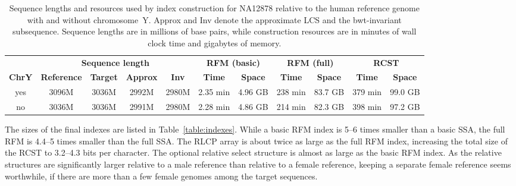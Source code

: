 \documentclass[a4paper,11pt]{llncs}
\newcommand{\RCST}{\textsf{RCST}}
\newcommand{\SSA}{\textsf{SSA}}
\newcommand{\RFM}{\textsf{RFM}}
\newcommand{\RLCP}{\textsf{RLCP}}
\newcommand{\LCS}{\textsf{LCS}}
\begin{document}
\begin{table}
\caption{Sequence lengths and resources used by index construction for NA12878
relative to the human reference genome with and without chromosome~Y. Approx
and Inv denote the approximate \LCS{} and the bwt-invariant subsequence.
Sequence lengths are in millions of base pairs, while construction resources
are in minutes of wall clock time and gigabytes of
memory.}\label{table:construction}
\setlength{\extrarowheight}{2pt}
\setlength{\tabcolsep}{3pt}
\begin{center}
\begin{tabular}{c|cccc|cc|cc|cc}
\hline
 &
\multicolumn{4}{c|}{\textbf{Sequence length}} &
\multicolumn{2}{c|}{\textbf{\RFM{} (basic)}} &
\multicolumn{2}{c|}{\textbf{\RFM{} (full)}} &
\multicolumn{2}{c}{\textbf{\RCST}} \\
\textbf{ChrY} &
\textbf{Reference} & \textbf{Target} & \textbf{Approx} & \textbf{Inv} &
\textbf{Time} & \textbf{Space} &
\textbf{Time} & \textbf{Space} &
\textbf{Time} & \textbf{Space} \\
\hline
yes & 3096M & 3036M & 2992M & 2980M & 2.35 min & 4.96 GB & 238 min & 83.7 GB &
379 min & 99.0 GB \\
no  & 3036M & 3036M & 2991M & 2980M & 2.28 min & 4.86 GB & 214 min & 82.3 GB &
398 min & 97.2 GB \\
\hline
\end{tabular}
\end{center}
\end{table}

The sizes of the final indexes are listed in Table~\ref{table:indexes}. While
a basic \RFM{} index is 5\nobreakdash--6 times smaller than a basic \SSA, the
full \RFM{} is 4.4\nobreakdash--5 times smaller than the full \SSA. The
\RLCP{} array is about twice as large as the full \RFM{} index, increasing the
total size of the \RCST{} to 3.2\nobreakdash--4.3 bits per character. The
optional relative select structure is almost as large as the basic \RFM{}
index. As the relative structures are significantly larger relative to a male
reference than relative to a female reference, keeping a separate female
reference seems worthwhile, if there are more than a few female genomes among
the target sequences.
\end{document}
